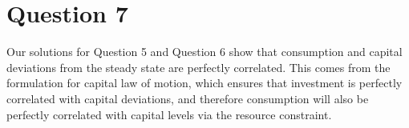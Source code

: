 \documentclass[11pt]{article} %
\begin{document}
\section{Question 7}
Our solutions for Question 5 and Question 6 show that consumption and capital deviations from the steady state are perfectly correlated. This comes from the formulation for capital law of motion, which ensures that investment is perfectly correlated with capital deviations, and therefore consumption will also be perfectly correlated with capital levels via the resource constraint.
\end{document}
